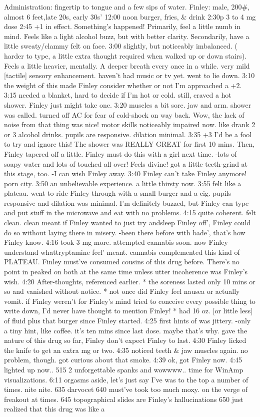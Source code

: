 \documentclass[12pt]{book}
\begin{document}
Administration: fingertip to tongue and a few sips of water. Finley: male, 200\#, almost 6 feet,late 20s, early 30s' 12:00 noon burger, fries, \& drink 2:30p 3 to 4 mg dose 2:45 +1 in effect. Something's happened! Primarily, feel a little numb in mind. Feels like a light alcohol buzz, but with better clarity. Secondarily, have a little sweaty/clammy felt on face. 3:00 slightly, but noticeably imbalanced. ( harder to type, a little extra thought required when walked up or down stairs). Feels a little heavier, mentally. A deeper breath every once in a while. very mild [tactile] sensory enhancement. haven't had music or tv yet. went to lie down. 3:10 the weight of this made Finley consider whether or not I'm approached a +2. 3:15 needed a blanket, hard to decide if I'm hot or cold. still, craved a hot shower. Finley just might take one. 3:20 muscles a bit sore. jaw and arm. shower was called. turned off AC for fear of cold-shock on way back. Wow, the lack of noise from that thing was nice! motor skills noticeably impaired now. like drank 2 or 3 alcohol drinks. pupils are responsive. dilation minimal. 3:35 +3 I'd be a fool to try and ignore this! The shower was REALLY GREAT for first 10 mins. Then, Finley tapered off a little. Finley must do this with a girl next time. -lots of soapy water and lots of touched all over! Feels divine! got a little teeth-grind at this stage, too. -I can wish Finley away. 3:40 Finley can't take Finley anymore! porn city. 3:50 an unbelievable experience. a little thirsty now. 3:55 felt like a plateau. went to ride Finley through with a small burger and a cig. pupils responsive and dilation was minimal. I'm definitely buzzed, but Finley can type and put stuff in the microwave and eat with no problems. 4:15 quite coherent. felt clean. clean meant if Finley wanted to just try andsleep Finley off', Finley could do so without laying there in misery. -been there before with bade', that's how Finley know. 4:16 took 3 mg more. attempted cannabis soon. now Finley understand whattryptamine feel' meant. cannabis complemented this kind of PLATEAU. Finley must've consumed cousins of this drug before. There's no point in peaked on both at the same time unless utter incoherence was Finley's wish. 4:20 After-thoughts, referenced earlier. * the soreness lasted only 10 mins or so and vanished without notice. * not once did Finley feel nausea or actually vomit. if Finley weren't for Finley's mind tried to conceive every possible thing to write down, I'd never have thought to mention Finley! * had 16 oz. [or little less] of fluid plus that burger since Finley started. 4:25 first hints of was jittery. -only a tiny hint, like coffee. it's ten mins since last dose. maybe that's why. gave the nature of this drug so far, Finley don't expect Finley to last. 4:30 Finley licked the knife to get an extra mg or two. 4:35 noticed teeth \& jaw muscles again. no problem, though. got curious about that smoke. 4:39 ok, got Finley now. 4:45 lighted up now.. 515 2 unforgettable spanks and wowwww.. time for WinAmp visualizations. 6:11 orgasms aside, let's just say I've was to the top a number of times. nite nite. 635 darvocet 640 must've took too much moxy. on the verge of freakout at times. 645 topographical slides are Finley's hallucinations 650 just realized that this drug was like a 
\end{document}
